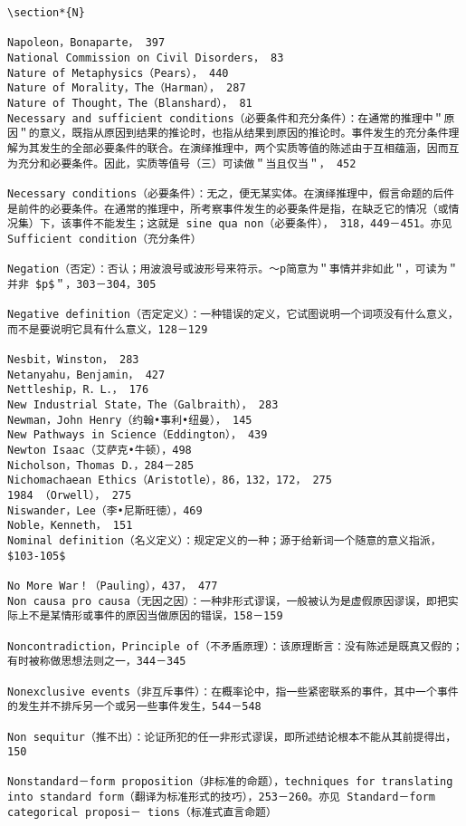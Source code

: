 \begin{verbatim}
\section*{N}

Napoleon，Bonaparte， 397
National Commission on Civil Disorders， 83
Nature of Metaphysics（Pears）， 440
Nature of Morality，The（Harman）， 287
Nature of Thought，The（Blanshard）， 81
Necessary and sufficient conditions（必要条件和充分条件）：在通常的推理中＂原因＂的意义，既指从原因到结果的推论时，也指从结果到原因的推论时。事件发生的充分条件理解为其发生的全部必要条件的联合。在演绎推理中，两个实质等值的陈述由于互相蕴涵，因而互为充分和必要条件。因此，实质等值号（三）可读做＂当且仅当＂， 452

Necessary conditions（必要条件）：无之，便无某实体。在演绎推理中，假言命题的后件是前件的必要条件。在通常的推理中，所考察事件发生的必要条件是指，在缺乏它的情况（或情况集）下，该事件不能发生；这就是 sine qua non（必要条件）， 318，449－451。亦见 Sufficient condition（充分条件）

Negation（否定）：否认；用波浪号或波形号来符示。～p简意为＂事情并非如此＂，可读为＂并非 $p$＂，303－304，305

Negative definition（否定定义）：一种错误的定义，它试图说明一个词项没有什么意义，而不是要说明它具有什么意义，128－129

Nesbit，Winston， 283
Netanyahu，Benjamin， 427
Nettleship，R．L．， 176
New Industrial State，The（Galbraith）， 283
Newman，John Henry（约翰•事利•纽曼）， 145
New Pathways in Science（Eddington）， 439
Newton Isaac（艾萨克•牛顿），498
Nicholson，Thomas D．，284－285
Nichomachaean Ethics（Aristotle），86，132，172， 275
1984 （Orwell）， 275
Niswander，Lee（李•尼斯旺徳），469
Noble，Kenneth， 151
Nominal definition（名义定义）：规定定义的一种；源于给新词一个随意的意义指派， $103-105$

No More War！（Pauling），437， 477
Non causa pro causa（无因之因）：一种非形式谬误，一般被认为是虚假原因谬误，即把实际上不是某情形或事件的原因当做原因的错误，158－159

Noncontradiction，Principle of（不矛盾原理）：该原理断言：没有陈述是既真又假的；有时被称做思想法则之一，344－345

Nonexclusive events（非互斥事件）：在概率论中，指一些紧密联系的事件，其中一个事件的发生并不排斥另一个或另一些事件发生，544－548

Non sequitur（推不出）：论证所犯的任一非形式谬误，即所述结论根本不能从其前提得出， 150

Nonstandard－form proposition（非标准的命题），techniques for translating into standard form（翻译为标准形式的技巧），253－260。亦见 Standard－form categorical proposi－ tions（标准式直言命题）


\end{verbatim}
